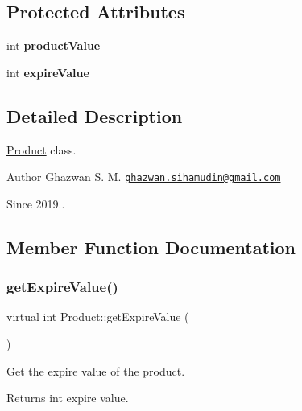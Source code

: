 \subsection*{Protected Attributes}
\begin{DoxyCompactItemize}
\item 
\mbox{\label{classProduct_a42bbedb8ecb2675718cc0e0ba7d4ead8}} 
int {\bfseries product\+Value}
\item 
\mbox{\label{classProduct_af9e601cc45c4281a39e7f4cbdf4d2a53}} 
int {\bfseries expire\+Value}
\end{DoxyCompactItemize}


\subsection{Detailed Description}
\hyperlink{classProduct}{Product} class.

\begin{DoxyAuthor}{Author}
Ghazwan S. M. \href{mailto:ghazwan.sihamudin@gmail.com}{\tt ghazwan.\+sihamudin@gmail.\+com} 
\end{DoxyAuthor}
\begin{DoxySince}{Since}
2019.. 
\end{DoxySince}


\subsection{Member Function Documentation}
\mbox{\label{classProduct_a739031c520fb9e376da3d3fc2955c7e7}} 
\subsubsection{\texorpdfstring{get\+Expire\+Value()}{getExpireValue()}}
{\footnotesize\ttfamily virtual int Product\+::get\+Expire\+Value (\begin{DoxyParamCaption}{ }\end{DoxyParamCaption})\hspace{0.3cm}{\ttfamily [pure virtual]}}

Get the expire value of the product. \begin{DoxyReturn}{Returns}
int expire value. 
\end{DoxyReturn}


